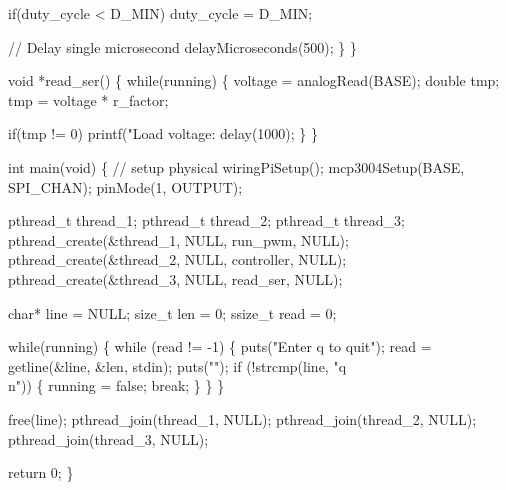 \documentclass[a4paper, 12pt]{article}
\begin{document}
\begin{appendices}
		if(duty\_cycle < D\_MIN)
			duty\_cycle = D\_MIN;

		// Delay single microsecond
		delayMicroseconds(500);
	\}
\}

void *read\_ser() \{
	while(running) \{
		voltage = analogRead(BASE);
		double tmp;
	        tmp = voltage * r\_factor;
		
		if(tmp != 0)
			printf("Load voltage: %
		delay(1000);
	\}
\}

int main(void) \{
	// setup physical
	wiringPiSetup();
	mcp3004Setup(BASE, SPI\_CHAN);
	pinMode(1, OUTPUT); 

	pthread\_t thread\_1;
	pthread\_t thread\_2;
	pthread\_t thread\_3;
	pthread\_create(\&thread\_1, NULL, run\_pwm, NULL);
	pthread\_create(\&thread\_2, NULL, controller, NULL);
	pthread\_create(\&thread\_3, NULL, read\_ser, NULL);

	char* line = NULL;
	size\_t len = 0;
	ssize\_t read = 0;

	while(running)
	\{
		while (read != -1) \{
			puts("Enter q to quit");
			read = getline(\&line, \&len, stdin);
			puts("");
			if (!strcmp(line, "q\\n")) \{
				running = false;
				break;
			\}
		\}
	\}

	free(line);
	pthread\_join(thread\_1, NULL);
	pthread\_join(thread\_2, NULL);
	pthread\_join(thread\_3, NULL);

	return 0;
\}

\end{appendices}
\end{document}

